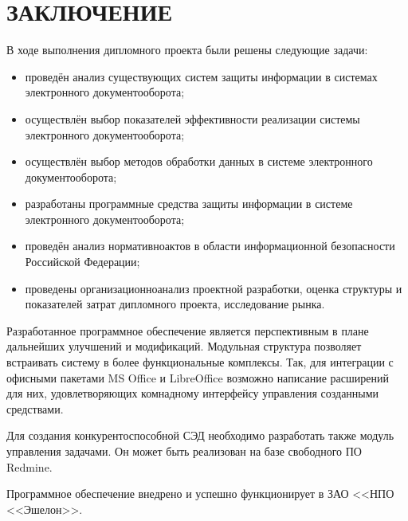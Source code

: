 \chapter*{ЗАКЛЮЧЕНИЕ}						%

В ходе выполнения дипломного проекта были решены следующие задачи:
\begin{itemize}
	\item проведён анализ существующих систем защиты информации в системах электронного документооборота;
	\item осуществлён выбор показателей эффективности реализации системы электронного документооборота;
	\item осуществлён выбор методов обработки данных в системе электронного документооборота;
	\item разработаны программные средства защиты информации в системе электронного документооборота;
	\item проведён анализ нормативно актов в области информационной безопасности Российской Федерации;
	\item проведены организационно анализ проектной разработки, оценка структуры и показателей затрат дипломного проекта, исследование рынка.
\end{itemize}

\vspace{\baselineskip}
Разработанное программное обеспечение является перспективным в плане дальнейших улучшений и модификаций. Модульная структура позволяет встраивать систему в более функциональные комплексы. Так, для интеграции с офисными пакетами MS Office и LibreOffice возможно написание расширений для них, удовлетворяющих комнадному интерфейсу управления созданными средствами.

Для создания конкурентоспособной СЭД необходимо разработать также модуль управления задачами. Он может быть реализован на базе свободного ПО Redmine.

\vspace{\baselineskip}
Программное обеспечение внедрено и успешно функционирует в ЗАО <<НПО <<Эшелон>>.

\clearpage